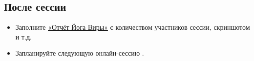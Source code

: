 \subsection*{После сессии}
\begin{itemize}
\item Заполните \href{https://forms.gle/q1N7jG4vBEWBmng86}{«Отчёт Йога Виры»} с количеством участников сессии, скриншотом и т.д.

\item Запланируйте следующую онлайн-сессию \faSmileO. 
\end{itemize}
